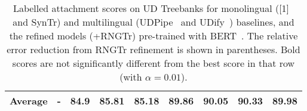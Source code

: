 \begin{table*}[bt]
\begin{adjustbox}{width=\linewidth}
\begin{tabular}{|c|c|c|c|cl|cl|c|}
    \hline
    Average & - & 84.9 & 85.81 & 85.18 & 89.86 & 90.05 & 90.33 & 89.98 \\
    \hline
  \end{tabular}
  \end{adjustbox}
  \caption{\label{ud-las} Labelled attachment scores on UD Treebanks for monolingual ([1]~\cite{Kulmizev_2019} and SynTr) and multilingual (UDPipe~\cite{straka-2018-udpipe} and UDify~\cite{Kondratyuk_2019}) baselines, and the refined models (+RNGTr) pre-trained with BERT~\cite{devlin2018bert}.
    The relative error reduction from RNGTr refinement is shown in parentheses.
    Bold scores are not significantly different from the best score in that row (with $\alpha=0.01$).
}
\end{table*}





